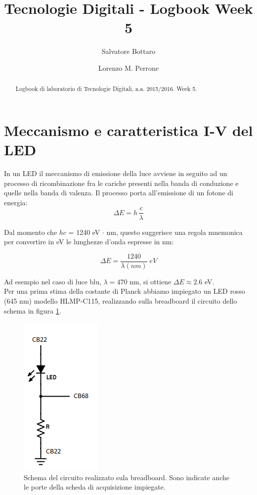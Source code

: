 \documentclass[journal, a4paper]{IEEEtran}
\begin{document}
	\title{Tecnologie Digitali - Logbook Week 5}
	\author[1]{Salvatore Bottaro}
		\author[2]{Lorenzo M. Perrone}
	\maketitle
	
\begin{abstract}
	Logbook di laboratorio di Tecnologie Digitali, a.a. 2015/2016. Week 5.
\end{abstract}

\section{Meccanismo e caratteristica I-V del LED}
In un LED il meccanismo di emissione della luce avviene in seguito ad un processo di ricombinazione fra le cariche presenti nella banda di conduzione e quelle nella banda di valenza. Il processo porta all'emissione di un fotone di energia:
\begin{equation}
\Delta E = h \, \frac{c}{\lambda}
\end{equation}

Dal momento che $hc$ = 1240 eV $\cdot$ nm, questo suggerisce una regola mnemonica per convertire in eV le lunghezze d'onda espresse in nm:

\begin{equation}
\Delta E = \frac{1240}{\lambda(nm)} \; eV
\end{equation}

Ad esempio nel caso di luce blu, $\lambda = 470$ nm, si ottiene $\Delta E \approx 2.6$ eV.\\
Per una prima stima della costante di Planck abbiamo impiegato un LED rosso (645 nm) modello HLMP-C115, realizzando sulla breadboard il circuito dello schema in figura \ref{fig:led_circ}.\\

\begin{figure}[htp]
\centering
\includegraphics[scale=.6]{led_circ}
\caption{Schema del circuito realizzato sula breadboard. Sono indicate anche le porte della scheda di acquisizione impiegate.}
\label{fig:led_circ}
\end{figure}
\end{document}
